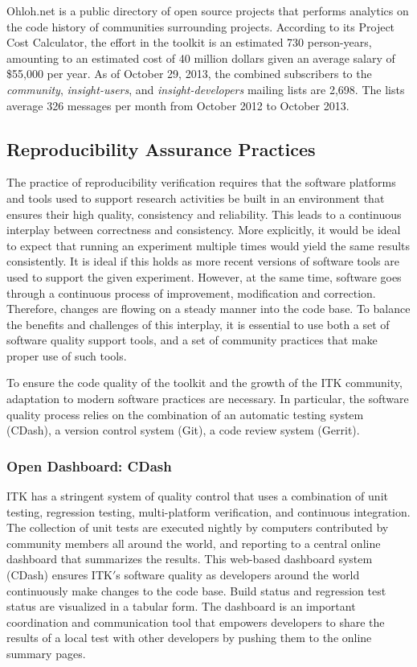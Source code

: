 \documentclass{frontiersENG} %
\begin{document}
Ohloh.net \cite{OhlohITK2013} is a public directory of open source projects
that performs analytics on the code history of communities surrounding
projects. According to its Project Cost Calculator, the effort in the toolkit
is an estimated 730 person-years, amounting to an estimated cost of 40 million
dollars given an average salary of \$55,000 per year.  As of October 29, 2013,
the combined subscribers to the \textit{community}, \textit{insight-users}, and
\textit{insight-developers} mailing lists are 2,698.  The lists average 326
messages per month from October 2012 to October 2013.


\subsection{Reproducibility Assurance Practices}

The practice of reproducibility verification requires that the software
platforms and tools used to support research activities be built in an
environment that ensures their high quality, consistency and reliability. This
leads to a continuous interplay between correctness and consistency. More
explicitly, it would be ideal to expect that running an experiment multiple times
would yield the same results consistently. It is ideal if this holds as more
recent versions of software tools are used to support the given experiment.
However, at the same time, software goes through a continuous process of
improvement, modification and correction. Therefore, changes are flowing on a
steady manner into the code base. To balance the benefits and challenges of
this interplay, it is essential to use both a set of software quality support
tools, and a set of community practices that make proper use of such tools.

To ensure the code quality of the toolkit and the growth of the ITK community,
adaptation to modern software practices are necessary. In particular, the
software quality process relies on the combination of an automatic
testing system (CDash), a version control system (Git), a code review system
(Gerrit).

\subsubsection{Open Dashboard: CDash}

ITK has a stringent system of quality control that uses a combination of unit
testing, regression testing, multi-platform verification, and continuous
integration. The collection of unit tests are executed nightly by computers
contributed by community members all around the world, and reporting to a
central online dashboard that summarizes the results. This web-based dashboard
system (CDash) \cite{ITKDashboard} ensures ITK$'$s software quality as
developers around the world continuously make changes to the code base. Build
status and regression test status are visualized in a tabular form. The
dashboard is an important coordination and communication tool that empowers
developers to share the results of a local test with other developers by
pushing them to the online summary pages.
\end{document}
